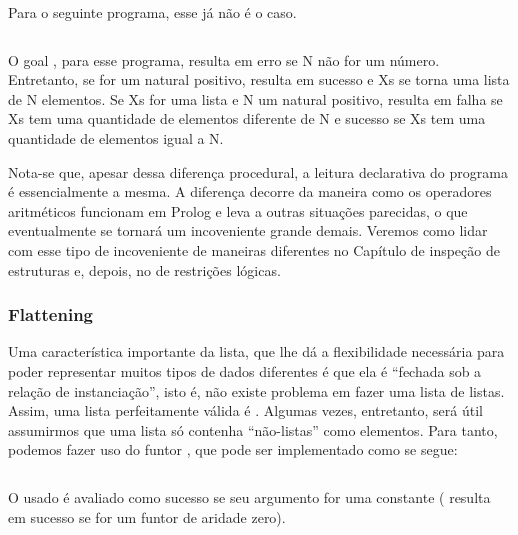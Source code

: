 Para o seguinte programa, esse já não é o caso.

    \begin{listing}
\inputminted{prolog}{../Exemplos/Cap3/prog3_length2.pl}\label{lst:length2}
    \end{listing}

O goal , para esse programa, resulta em erro se N não for um número. Entretanto, se for um natural positivo,  resulta em sucesso e Xs se torna uma lista de N elementos. Se Xs for uma lista e N um natural positivo,  resulta em falha se Xs tem uma quantidade de elementos diferente de N e sucesso se Xs tem uma quantidade de elementos igual a N.

Nota-se que, apesar dessa diferença procedural, a leitura declarativa do programa é essencialmente a mesma. A diferença decorre da maneira como os operadores aritméticos funcionam em Prolog e leva a outras situações parecidas, o que eventualmente se tornará um incoveniente grande demais. Veremos como lidar com esse tipo de incoveniente de maneiras diferentes no Capítulo de inspeção de estruturas %
e, depois, no de restrições lógicas. %

\subsubsection{Flattening}

Uma característica importante da lista, que lhe dá a flexibilidade necessária para poder representar muitos tipos de dados diferentes
é que ela é ``fechada sob a relação de instanciação'', isto é, não existe problema em fazer uma lista de listas. Assim, uma lista
perfeitamente válida é \codigo{[[[a,b],c],[]]}. Algumas vezes, entretanto, será útil assumirmos que
uma lista  só contenha ``não-listas'' como elementos. Para tanto, podemos fazer uso do funtor
, que pode ser implementado como se segue:

    \begin{listing}
\inputminted{prolog}{../Exemplos/Cap3/prog3_flatten.pl}\label{lst:flatten}
    \end{listing}

\noindent O  usado é avaliado como sucesso se seu argumento for uma constante ( resulta em sucesso
se  for um funtor de aridade zero).


